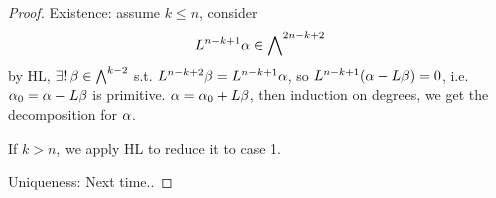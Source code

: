 \begin{proof}
Existence: assume $k\leq n$, consider
$$L^{n-k+1}\alpha\in\bigwedge\nolimits^{2n-k+2}$$
by HL, $\exists !\,\beta\in\bigwedge\nolimits^{k-2}$ s.t.
$L^{n-k+2}\beta=L^{n-k+1}\alpha$, so
$L^{n-k+1}(\alpha-L\beta)=0$, i.e. $\alpha_0=\alpha-L\beta$
is primitive. $\alpha=\alpha_0+L\beta$, then induction on degrees,
we get the decomposition for $\alpha$.

If $k>n$, we apply HL to reduce it to case 1.

Uniqueness: Next time..
\end{proof}






















